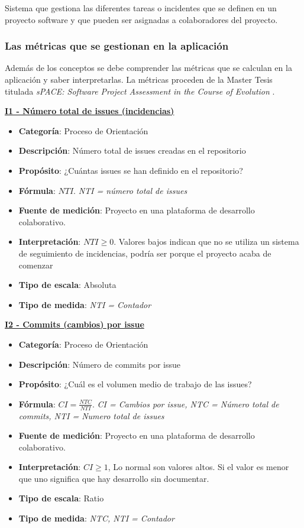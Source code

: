 Sistema que gestiona las diferentes tareas o incidentes que se definen en un proyecto software y que pueden ser asignadas a colaboradores del proyecto.

\subsubsection{Las métricas que se gestionan en la aplicación}

Además de los conceptos se debe comprender las métricas que se calculan en la aplicación y saber interpretarlas. La métricas proceden de la Master Tesis titulada \textit{sPACE: Software Project Assessment in the Course of Evolution} \cite{ratzinger_space:_2007}.

\textbf{\underline{I1 - Número total de issues (incidencias)}}

\begin{itemize}
	\item \textbf{Categoría}: Proceso de Orientación
	\item \textbf{Descripción}: Número total de issues creadas en el repositorio
	\item \textbf{Propósito}: ¿Cuántas issues se han definido en el repositorio?
	\item \textbf{Fórmula}: $NTI$. \textit{NTI = número total de issues}
	\item \textbf{Fuente de medición}: Proyecto en una plataforma de desarrollo colaborativo.
	\item \textbf{Interpretación}: $NTI \geq 0$. Valores bajos indican que no se utiliza un sistema de seguimiento de incidencias, podría ser porque el proyecto acaba de comenzar
	\item \textbf{Tipo de escala}: Absoluta
	\item \textbf{Tipo de medida}: \textit{NTI = Contador}
\end{itemize}

\textbf{\underline{I2 - Commits (cambios) por issue}}

\begin{itemize}
	\item \textbf{Categoría}: Proceso de Orientación
	\item \textbf{Descripción}: Número de commits por issue
	\item \textbf{Propósito}: ¿Cuál es el volumen medio de trabajo de las issues?
	\item \textbf{Fórmula}: $CI = \frac{NTC}{NTI}$. \textit{CI = Cambios por issue, NTC = Número total de commits, NTI = Numero total de issues}
	\item \textbf{Fuente de medición}: Proyecto en una plataforma de desarrollo colaborativo.
	\item \textbf{Interpretación}: $CI \geq 1$, Lo normal son valores altos. Si el valor es menor que uno significa que hay desarrollo sin documentar.
	\item \textbf{Tipo de escala}: Ratio 
	\item \textbf{Tipo de medida}: \textit{NTC, NTI = Contador}
\end{itemize}

